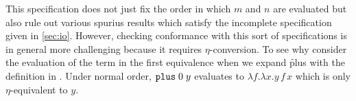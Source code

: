 This specification does not just fix the order in which $m$
and $n$ are evaluated but also rule out various spurius
results which satisfy the incomplete specification given in
\cref{sec:io}.
%
However, checking conformance with this sort of
specifications is in general more challenging because it
requires $\eta$-conversion.
%
To see why consider the evaluation of the term in the first
equivalence when we expand \f{plus} with the definition in
.
%
Under normal order, $\texttt{plus}\;0\;y$ evaluates to $\lambda
f.\lambda x. y\,f\,x$ which is only $\eta$-equivalent to
$y$.

